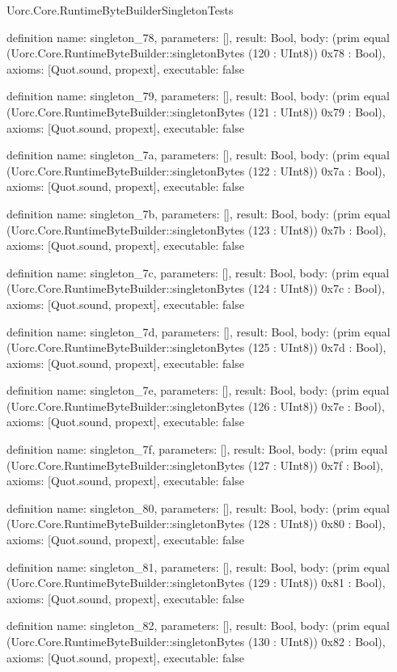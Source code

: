 \begin{lexlean}{Uorc.Core.RuntimeByteBuilderSingletonTests}
\begin{semanticmodule}
definition{
  name: singleton_78,
  parameters: [],
  result: Bool,
  body: (prim equal (Uorc.Core.RuntimeByteBuilder::singletonBytes (120 : UInt8)) 0x78 : Bool),
  axioms: [Quot.sound, propext],
  executable: false
}

definition{
  name: singleton_79,
  parameters: [],
  result: Bool,
  body: (prim equal (Uorc.Core.RuntimeByteBuilder::singletonBytes (121 : UInt8)) 0x79 : Bool),
  axioms: [Quot.sound, propext],
  executable: false
}

definition{
  name: singleton_7a,
  parameters: [],
  result: Bool,
  body: (prim equal (Uorc.Core.RuntimeByteBuilder::singletonBytes (122 : UInt8)) 0x7a : Bool),
  axioms: [Quot.sound, propext],
  executable: false
}

definition{
  name: singleton_7b,
  parameters: [],
  result: Bool,
  body: (prim equal (Uorc.Core.RuntimeByteBuilder::singletonBytes (123 : UInt8)) 0x7b : Bool),
  axioms: [Quot.sound, propext],
  executable: false
}

definition{
  name: singleton_7c,
  parameters: [],
  result: Bool,
  body: (prim equal (Uorc.Core.RuntimeByteBuilder::singletonBytes (124 : UInt8)) 0x7c : Bool),
  axioms: [Quot.sound, propext],
  executable: false
}

definition{
  name: singleton_7d,
  parameters: [],
  result: Bool,
  body: (prim equal (Uorc.Core.RuntimeByteBuilder::singletonBytes (125 : UInt8)) 0x7d : Bool),
  axioms: [Quot.sound, propext],
  executable: false
}

definition{
  name: singleton_7e,
  parameters: [],
  result: Bool,
  body: (prim equal (Uorc.Core.RuntimeByteBuilder::singletonBytes (126 : UInt8)) 0x7e : Bool),
  axioms: [Quot.sound, propext],
  executable: false
}

definition{
  name: singleton_7f,
  parameters: [],
  result: Bool,
  body: (prim equal (Uorc.Core.RuntimeByteBuilder::singletonBytes (127 : UInt8)) 0x7f : Bool),
  axioms: [Quot.sound, propext],
  executable: false
}

definition{
  name: singleton_80,
  parameters: [],
  result: Bool,
  body: (prim equal (Uorc.Core.RuntimeByteBuilder::singletonBytes (128 : UInt8)) 0x80 : Bool),
  axioms: [Quot.sound, propext],
  executable: false
}

definition{
  name: singleton_81,
  parameters: [],
  result: Bool,
  body: (prim equal (Uorc.Core.RuntimeByteBuilder::singletonBytes (129 : UInt8)) 0x81 : Bool),
  axioms: [Quot.sound, propext],
  executable: false
}

definition{
  name: singleton_82,
  parameters: [],
  result: Bool,
  body: (prim equal (Uorc.Core.RuntimeByteBuilder::singletonBytes (130 : UInt8)) 0x82 : Bool),
  axioms: [Quot.sound, propext],
  executable: false
}


\end{semanticmodule}
\end{lexlean}
